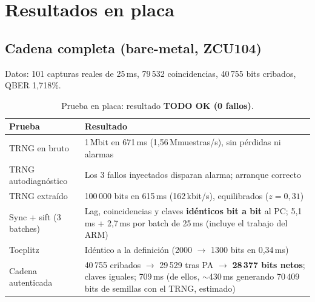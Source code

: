 \documentclass[a4paper,11pt]{article}
\begin{document}
\begin{table}[htbp]
\centering
\small
\begin{minipage}[t]{0.38\textwidth}
\centering
{}
\end{minipage}\hfill
\begin{minipage}[t]{0.58\textwidth}
\centering
{}\label{tab:modulos}
\end{minipage}
\end{table}

\section{Resultados en placa}

\subsection{Cadena completa (bare-metal, ZCU104)}
Datos: 101 capturas reales de 25\,ms, 79\,532 coincidencias, 40\,755 bits cribados, QBER 1,718\%.

\begin{table}[htbp]
\centering
\caption{Prueba en placa: resultado \textcolor{ok}{\textbf{TODO OK (0 fallos)}}.}
\small
\begin{tabularx}{\textwidth}{l X}
\toprule
Prueba & Resultado \\
\midrule
TRNG en bruto & 1\,Mbit en 671\,ms (1,56\,Mmuestras/s), sin pérdidas ni alarmas \\
TRNG autodiagnóstico & Los 3 fallos inyectados disparan alarma; arranque correcto \\
TRNG extraído & 100\,000 bits en 615\,ms (162\,kbit/s), equilibrados ($z = 0{,}31$) \\
Sync + sift (3 batches) & Lag, coincidencias y claves \textbf{idénticos bit a bit} al PC; 5,1\,ms + 2,7\,ms por batch de 25\,ms (incluye el trabajo del ARM) \\
Toeplitz & Idéntico a la definición (2000 $\rightarrow$ 1300 bits en 0,34\,ms) \\
Cadena autenticada & 40\,755 cribados $\rightarrow$ 29\,529 tras PA $\rightarrow$ \textbf{28\,377 bits netos}; claves iguales; 709\,ms
  (de ellos, $\sim$430\,ms generando 70\,409 bits de semillas con el TRNG, estimado) \\
\bottomrule
\end{tabularx}
\end{table}
\end{document}
